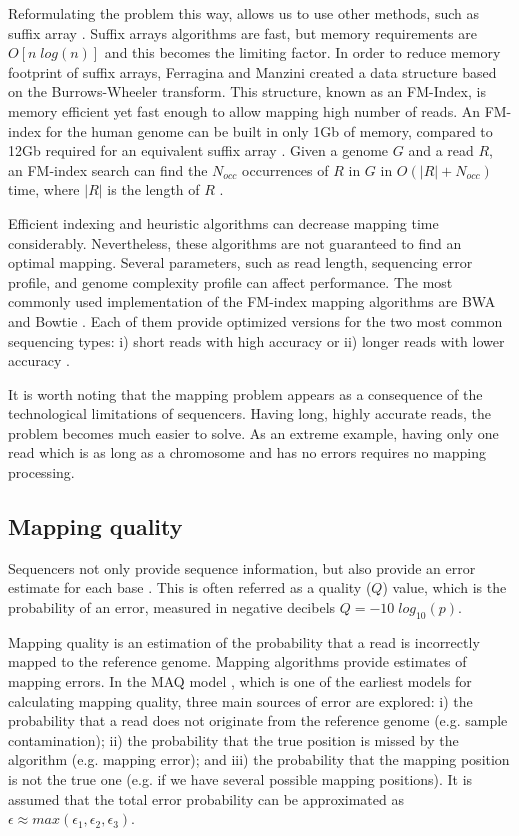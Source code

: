 Reformulating the problem this way, allows us to use other methods, such as suffix array \cite{durbin1998biological}. Suffix arrays algorithms are fast, but memory requirements are $O[ n \; log(n) ]$ and this becomes the limiting factor. In order to reduce memory footprint of suffix arrays, Ferragina and Manzini \cite{ferragina2000opportunistic} created a data structure based on the Burrows-Wheeler transform.  This structure, known as an FM-Index, is memory efficient yet fast enough to allow mapping high number of reads.  An FM-index for the human genome can be built in only 1Gb of memory, compared to 12Gb required for an equivalent suffix array \cite{li2010fast}.  Given a genome $G$ and a read $R$, an FM-index search can find the $N_{occ}$ occurrences of $R$ in $G$ in $O(|R| + N_{occ} )$ time, where $|R|$ is the length of $R$ \cite{li2010fast}.

Efficient indexing and heuristic algorithms can decrease mapping time considerably.  Nevertheless, these algorithms are not guaranteed to find an optimal mapping.  Several parameters, such as read length, sequencing error profile, and genome complexity profile can affect performance.  The most commonly used implementation of the FM-index mapping algorithms are BWA \cite{li2010fast, li2010fastlong} and Bowtie \cite{langmead2009ultrafast, langmead2012fast}.  Each of them provide optimized versions for the two most common sequencing types: i) short reads with high accuracy \cite{li2010fast,langmead2009ultrafast} or ii) longer reads with lower accuracy \cite{li2010fastlong, langmead2012fast}.

It is worth noting that the mapping problem appears as a consequence of the technological limitations of sequencers.  Having long, highly accurate reads, the problem becomes much easier to solve.  As an extreme example, having only one read which is as long as a chromosome and has no errors requires no mapping processing.  

\subsection{Mapping quality}

Sequencers not only provide sequence information, but also provide an error estimate for each base \cite{li2011statistical}.  This is often referred as a quality ($Q$) value, which is the probability of an error, measured in negative decibels $Q = -10 \; log_{10}(p)$.

Mapping quality is an estimation of the probability that a read is incorrectly mapped to the reference genome. Mapping algorithms provide estimates of mapping errors. In the MAQ model \cite{li2008mapping}, which is one of the earliest models for calculating mapping quality, three main sources of error are explored: i) the probability that a read does not originate from the reference genome (e.g. sample contamination); ii) the probability that the true position is missed by the algorithm (e.g. mapping error); and iii) the probability that the mapping position is not the true one (e.g. if we have several possible mapping positions). It is assumed that the total error probability can be approximated as $\epsilon \approx max(\epsilon_1,\epsilon_2, \epsilon_3)$.

